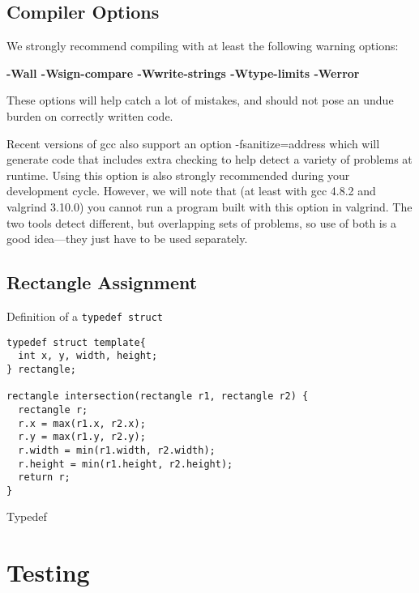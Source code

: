\documentclass[11pt, a4paper]{article}
\begin{document}
\subsection{Compiler Options}%
\label{sub:compiler_options}




We strongly recommend compiling with at least the following warning options:

\textbf{-Wall -Wsign-compare -Wwrite-strings -Wtype-limits -Werror}

These options will help catch a lot of mistakes, and should not pose an undue burden on correctly written code.

Recent versions of gcc also support an option -fsanitize=address which will generate code that includes extra checking to help detect a variety of problems at runtime. Using this option is also strongly recommended during your development cycle. However, we will note that (at least with gcc 4.8.2 and valgrind 3.10.0) you cannot run a program built with this option in valgrind. The two tools detect different, but overlapping sets of problems, so use of both is a good idea—they just have to be used separately.





\subsection{Rectangle Assignment}%
\label{sub:rectangle_assignment}

Definition of a \texttt{typedef struct} 

\begin{listing}
\begin{verbatim}
typedef struct template{
  int x, y, width, height;
} rectangle;

rectangle intersection(rectangle r1, rectangle r2) {
  rectangle r;
  r.x = max(r1.x, r2.x);
  r.y = max(r1.y, r2.y);
  r.width = min(r1.width, r2.width);
  r.height = min(r1.height, r2.height);
  return r;
}
\end{verbatim}
\caption{Typedef}
\label{lst:typedef}
\end{listing}



\section{Testing}%
\label{sec:testing}
\end{document}
